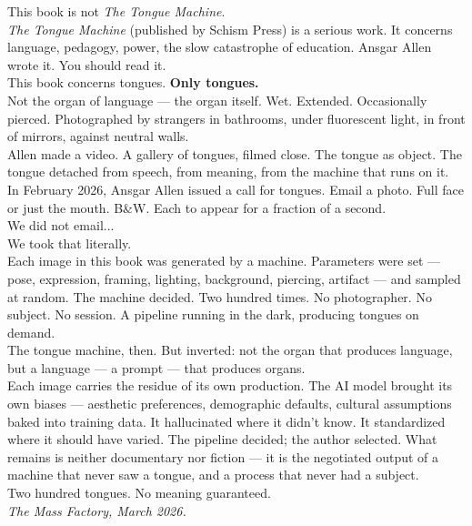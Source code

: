 \documentclass[10pt,oneside,openany]{book}
\begin{document}
  \small
  This book is not \textit{The Tongue Machine}. \\
  \vspace{0.3em}
  \textit{The Tongue Machine} (published by Schism Press) is a serious work. It concerns language, pedagogy,
  power, the slow catastrophe of education. Ansgar Allen wrote it.
  You should read it. \\
  \vspace{0.3em}
  This book concerns tongues. \textbf{Only tongues.} \\
  \vspace{0.3em}
  Not the organ of language --- the organ itself. Wet. Extended.
  Occasionally pierced. Photographed by strangers in bathrooms,
  under fluorescent light, in front of mirrors, against neutral walls. \\
  \vspace{0.3em}
  Allen made a video. A gallery of tongues, filmed close. The tongue
  as object. The tongue detached from speech, from meaning, from the
  machine that runs on it. \\
  \vspace{0.3em}
  In February 2026, Ansgar Allen issued a call for tongues. Email a
  photo. Full face or just the mouth. B\&W. Each to appear for a fraction
  of a second. \\
  \vspace{0.3em}
  We did not email... \\
  We took that literally. \\
  \vspace{0.3em}
  Each image in this book was generated by a machine. Parameters were
  set --- pose, expression, framing, lighting, background, piercing,
  artifact --- and sampled at random. The machine decided. Two hundred
  times. No photographer. No subject. No session. A pipeline running
  in the dark, producing tongues on demand. \\
  \vspace{0.3em}
  The tongue machine, then. But inverted: not the organ that produces
  language, but a language --- a prompt --- that produces organs. \\
  \vspace{0.8em}
  Each image carries the residue of its own production. The AI model
  brought its own biases --- aesthetic preferences, demographic defaults,
  cultural assumptions baked into training data. It hallucinated where
  it didn't know. It standardized where it should have varied.
  The pipeline decided; the author selected. What remains is neither
  documentary nor fiction --- it is the negotiated output of a machine
  that never saw a tongue, and a process that never had a subject. \\
  \vspace{0.8em}
  Two hundred tongues. No meaning guaranteed. \\
  \vspace{1.2em}
  \textit{The Mass Factory, March 2026.}
  \vspace*{\fill}
\newpage
\end{document}

